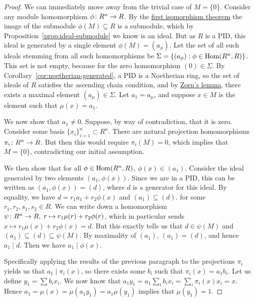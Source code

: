 \begin{proof}
    We can immediately move away from the trivial case of \(M = \{0\}\).
    Consider any module homomorphism \(\phi\colon R^n\to R\).
    By the \hyperref[thm:iso-1-mod]{first isomorphism theorem}
    the image of the submodule \(\phi(M) \subseteq R\) is a submodule,
    which by Proposition~\ref{prop:ideal-submodule} we know is an ideal.
    But as \(R\) is a PID,
    this ideal is generated by a single element \(\phi(M) = (a_\phi)\).
    Let the set of all such ideals stemming from all such homomorphisms be
    \(\Sigma = \{(a_\phi): \phi \in \operatorname{Hom}(R^n,R)\}\).
    This set is not empty, because for the zero homomorphism \((0) \in \Sigma\).
    By Corollary~\ref{cor:noetherian-generated}, a PID is a Noetherian ring,
    so the set of ideals of \(R\) satisfies the ascending chain condition,
    and by \hyperref[ax:zorn]{Zorn's lemma},
    there exists a maximal element \((a_\mu) \in \Sigma\).
    Let \(a_1 = a_\mu\), and suppose \(x \in M\) is the element such that \(\mu(x) = a_1\).

    We now show that \(a_1 \neq 0\).
    Suppose, by way of contradiction, that it is zero.
    Consider some basis \({\{x_i\}}_{i=1}^n \subset R^n\).
    There are natural projection homomorphisms \(\pi_i\colon R^n\to R\).
    But then this would require \(\pi_i(M) = 0\),
    which implies that \(M = \{0\}\),
    contradicting our initial assumption.

    We then show that for all \(\phi \in \operatorname{Hom}(R^n,R)\), \(\phi(x) \in (a_1)\).
    Consider the ideal generated by two elements \((a_1,\phi(x))\).
    Since we are in a PID, this can be written as \((a_1,\phi(x)) = (d)\),
    where \(d\) is a generator for this ideal.
    By equality, we have \(d = r_1a_1 + r_2\phi(x)\) and \((a_1) \subseteq (d)\).
    for some \(r_1,r_2,s_1,s_2 \in R\).
    We can write down a homomorphism \(\psi\colon R^n\to R,\;r\mapsto r_1\mu(r) + r_2\phi(r)\),
    which in particular sends \(x \mapsto r_1\mu(x) + r_2\phi(x) = d\).
    But this exactly tells us that \(d \in \psi(M)\) and \((a_1) \subseteq (d) \subseteq \psi(M)\).
    By maximality of \((a_1)\), \((a_1) = (d)\), and hence \(a_1 \mid d\).
    Then we have \(a_1 \mid \phi(x)\).

    Specifically applying the results of the previous paragraph to the projections \(\pi_i\)
    yields us that \(a_1 \mid \pi_i(x)\),
    so there exists some \(b_i\) such that \(\pi_i(x) = a_1b_i\).
    Let us define \(y_1 = \sum b_i x_i\).
    We now know that \(a_1y_1 = a_1 \sum_i b_i x_i = \sum_i \pi_i(x) x_i = x\).
    Hence \(a_1 = \mu(x) = \mu(a_1 y_1) = a_1 \mu(y_1)\) implies that \(\mu(y_1) = 1\).


\end{proof}

